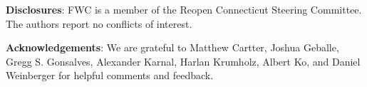 \documentclass[11pt]{article}
\begin{document}

\textbf{Disclosures}: FWC is a member of the Reopen Connecticut Steering Committee.  The authors report no conflicts of interest. 



\textbf{Acknowledgements}: We are grateful to
Matthew Cartter,
Joshua Geballe,
Gregg S. Gonsalves,
Alexander Karnal,
Harlan Krumholz,
Albert Ko, 
and
Daniel Weinberger
for helpful comments and feedback. 





\end{document}
